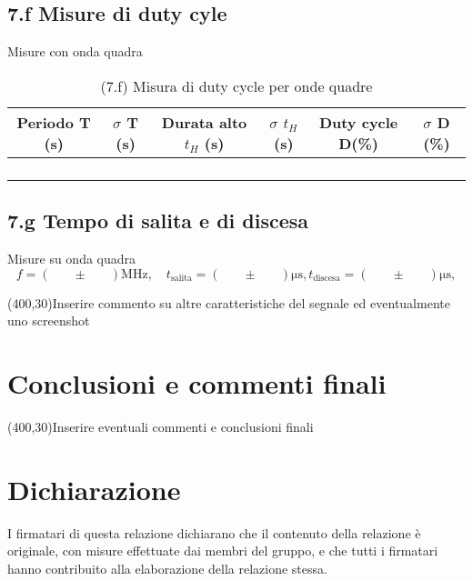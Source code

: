 \documentclass[10pt,a4paper]{article}
\newcommand{\exn}{\phantom{xxx}}
\begin{document}
\subsection*{7.f Misure di duty cyle}
Misure con onda quadra
\begin{table}[h]
\centering
\begin{tabular}{|c|c|c|c|c|c|}
\hline 
Periodo T (s)& $\sigma$ T (s) & Durata alto $t_H$ (s) & $\sigma$ $t_H$ (s) & Duty cycle D(\%) & $\sigma$ D (\%) \\
\hline 
\exn & \exn & \exn & \exn & \exn &\exn \\
\exn & \exn & \exn & \exn & \exn &\exn \\
\exn & \exn & \exn & \exn & \exn &\exn \\
\exn & \exn & \exn & \exn & \exn &\exn \\
\hline 
\end{tabular} 
\caption{(7.f) Misura di duty cycle per onde quadre }
\end{table}


\subsection*{7.g Tempo di salita e di discesa}
Misure su onda quadra
\[
f = (\exn \pm \exn) \mathrm{MHz}, \quad
t_\mathrm{salita} = (\exn \pm \exn) \mathrm{\mu s},
t_\mathrm{discesa} = (\exn \pm \exn) \mathrm{\mu s},
\]

\framebox(400,30){Inserire commento su altre caratteristiche del segnale ed eventualmente uno screenshot}

\section{Conclusioni e commenti finali}
\framebox(400,30){Inserire eventuali commenti e conclusioni finali}

\section*{Dichiarazione}
I firmatari di questa relazione dichiarano che il contenuto della relazione \`e originale, con misure effettuate dai membri del gruppo, e che tutti i firmatari hanno contribuito alla elaborazione della relazione stessa.
\end{document}

